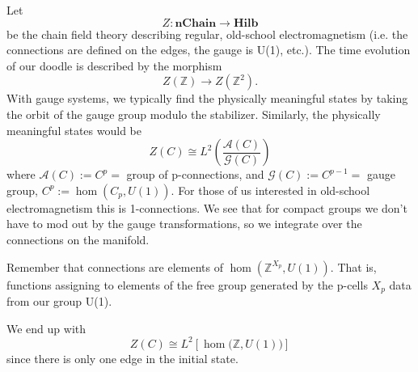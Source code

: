 Let 
\begin{equation}%
Z:\mathbf{nChain}\to\mathbf{Hilb}
\end{equation}
be the chain field theory describing regular, old-school
electromagnetism (i.e. the connections are defined on the edges,
the gauge is U(1), etc.). The time evolution of our doodle is
described by the morphism
\begin{equation}%
Z(\mathbb{Z})\to Z(\mathbb{Z}^{2}).
\end{equation}
With gauge systems, we typically find the physically meaningful
states by taking the orbit of the gauge group modulo the
stabilizer. Similarly, the physically meaningful states would be
\begin{equation}%
Z(C)\cong L^{2}\left(\frac{\mathcal{A}(C)}{\mathcal{G}(C)}\right)
\end{equation}
where $\mathcal{A}(C):=C^{p}=$ group of p-connections, and
$\mathcal{G}(C):=C^{p-1}=$ gauge group,
$C^{p}:=\hom(C_{p},U(1))$. For those of us interested in
old-school electromagnetism this is 1-connections. We see that
for compact groups we don't have to mod out by the gauge
transformations, so we integrate over the connections on the
manifold.

\begin{rmk}
Remember that connections are elements of
$\hom(\mathbb{Z}^{X_{p}},U(1))$. That is, functions assigning to
elements of the free group generated by the p-cells $X_{p}$ data
from our group U(1).
\end{rmk}

We end up with
\begin{equation}%
Z(C)\cong L^{2}\left[\hom\Big(\mathbb{Z},U(1)\Big)\right]
\end{equation}
since there is only one edge in the initial state.

